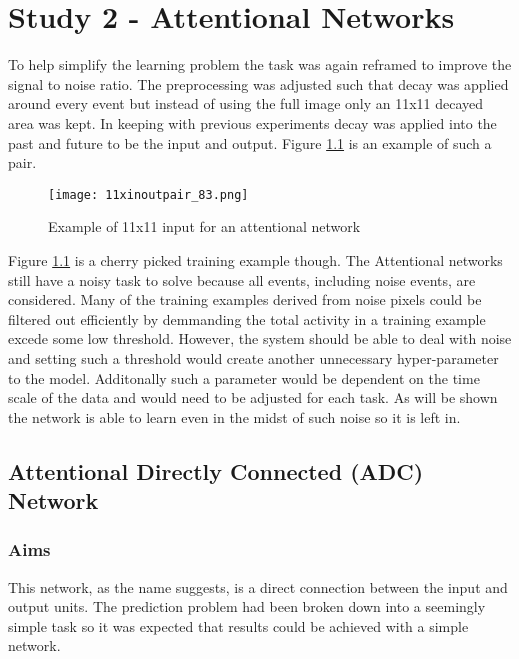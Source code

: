 \chapter{Study 2 - Attentional Networks}
\label{ch:attentional}
To help simplify the learning problem the task was again reframed to improve the signal to noise ratio.
The preprocessing was adjusted such that decay was applied around every event but instead of using the full image only an 11x11 decayed area was kept.
In keeping with previous experiments decay was applied into the past and future to be the input and output. 
Figure \ref{fig:11inoutpair} is an example of such a pair.

\begin{figure}[h]
    \centering
    \texttt{[image: 11xinoutpair\_83.png]}
    \caption{Example of 11x11 input for an attentional network}
    \label{fig:11inoutpair}
\end{figure}

Figure \ref{fig:11inoutpair} is a cherry picked training example though.
The Attentional networks still have a noisy task to solve because all events, including noise events, are considered. 
Many of the training examples derived from noise pixels could be filtered out efficiently by demmanding the total activity in a training example excede some low threshold.
However, the system should be able to deal with noise and setting such a threshold would create another unnecessary hyper-parameter to the model.
Additonally such a parameter would be dependent on the time scale of the data and would need to be adjusted for each task. 
As will be shown the network is able to learn even in the midst of such noise so it is left in. 

\section{Attentional Directly Connected (ADC) Network}

\subsection{Aims}
This network, as the name suggests, is a direct connection between the input and output units.
The prediction problem had been broken down into a seemingly simple task so it was expected that results could be achieved with a simple network. 

